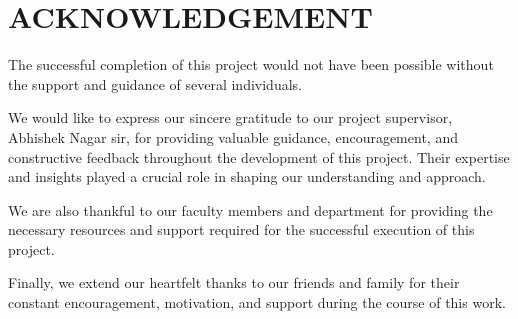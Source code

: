 \chapter*{ACKNOWLEDGEMENT}

The successful completion of this project would not have been possible without the support and guidance of several individuals.

We would like to express our sincere gratitude to our project supervisor, Abhishek Nagar sir, for providing valuable guidance, encouragement, and constructive feedback throughout the development of this project. Their expertise and insights played a crucial role in shaping our understanding and approach.

We are also thankful to our faculty members and department for providing the necessary resources and support required for the successful execution of this project.

Finally, we extend our heartfelt thanks to our friends and family for their constant encouragement, motivation, and support during the course of this work.

\newpage